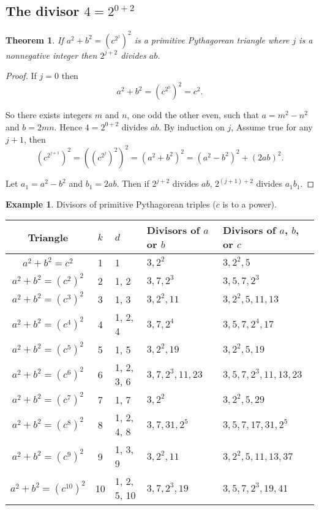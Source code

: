 \documentclass{article}
\newtheorem{theorem}{Theorem}
\theoremstyle{definition}
\newtheorem{example}{Example}[section]
\begin{document}
\subsection{The divisor \(4 = 2^{0+2}\)}

\begin{theorem}
If \(a^2+b^2 = (c^{2^j})^2\)
is a primitive Pythagorean triangle where \(j\) is a nonnegative integer then \(2^{j+2}\) divides \(ab\).
\label{th:Divisor}
\end{theorem}
\begin{proof}
If \(j=0\) then \[ a^2+b^2 = (c^{2^0})^2 = c^2. \]

So there exists integers \(m\) and \(n\), one odd the other even, such that \(a=m^2-n^2\) and \(b=2mn\). Hence \(4=2^{0+2}\) divides \(ab\). By induction on \(j\), Assume true for any \(j+1\), then \[ (c^{2^{j+1}})^2 = \left((c^{2^j})^2\right)^2
= (a^2+b^2)^2 = (a^2-b^2)^2 + (2ab)^2. \]

Let \(a_1=a^2-b^2\) and \(b_1=2ab\). Then if \(2^{j+2}\) divides \(ab\), \(2^{(j+1)+2}\) divides \(a_1b_1\).
\end{proof}

\begin{example} Divisors of primitive Pythagorean triples (\(c\) is to a power).

\bigskip

\begin{minipage}{0.9\textwidth}
\centering
\begin{tabular}{c|cl|ll}
Triangle & \(k\) & \(d\) & Divisors of \(a\) or \(b\) & Divisors of \(a\), \(b\), or \(c\) \\[2pt] \hline
\(a^2+b^2=c^2\) & 1 & 1 & \(3, 2^2\) & \(3, 2^2, 5\) \\
\(a^2+b^2=(c^2)^2\) & 2 & 1, 2 & \(3, 7, 2^3\) & \(3, 5, 7, 2^3\) \\
\(a^2+b^2=(c^3)^2\) & 3 & 1, 3 & \(3, 2^2, 11\) & \(3, 2^2, 5, 11, 13\) \\
\(a^2+b^2=(c^4)^2\) & 4 & 1, 2, 4 & \(3, 7, 2^4\) & \(3, 5, 7, 2^4, 17\) \\
\(a^2+b^2=(c^5)^2\) & 5 & 1, 5 & \(3, 2^2, 19\) & \(3, 2^2, 5, 19\) \\
\(a^2+b^2=(c^6)^2\) & 6 & 1, 2, 3, 6 & \(3, 7, 2^3, 11, 23\) & \(3, 5, 7, 2^3, 11, 13, 23\) \\
\(a^2+b^2=(c^7)^2\) & 7 & 1, 7 & \(3, 2^2\) & \(3, 2^2, 5, 29\) \\
\(a^2+b^2=(c^8)^2\) & 8 & 1, 2, 4, 8 & \(3, 7, 31, 2^5\) & \(3, 5, 7, 17, 31, 2^5\) \\
\(a^2+b^2=(c^9)^2\) & 9 & 1, 3, 9 & \(3, 2^2, 11\) & \(3, 2^2, 5, 11, 13, 37\) \\
\(a^2+b^2=(c^{10})^2\) & 10 & 1, 2, 5, 10 & \(3, 7, 2^3, 19\) & \(3, 5, 7, 2^3, 19, 41\)
\end{tabular}
\end{minipage}
\label{tab:Hypotenuse}
\end{example}
\end{document}
